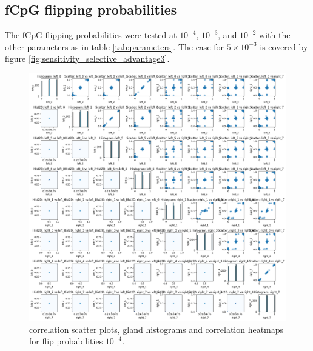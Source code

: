 \subsection{fCpG flipping probabilities}
The fCpG flipping probabilities were tested at $10^{-4}$, $10^{-3}$, and $10^{-2}$ with the other parameters as in table \ref{tab:parameters}. The case for $5\times10^{-3}$ is covered by figure \ref{fig:sensitivity_selective_advantage3}. \par
\begin{figure}[h]
    \centering
    \includegraphics[width=\textwidth]{Chapter_5/figures/sensitivity_flipprob1.png}
    \caption{correlation scatter plots, gland histograms and correlation heatmaps for flip probabilities $10^{-4}$.}
    \label{fig:sensitivity_flipprob1}
\end{figure}
